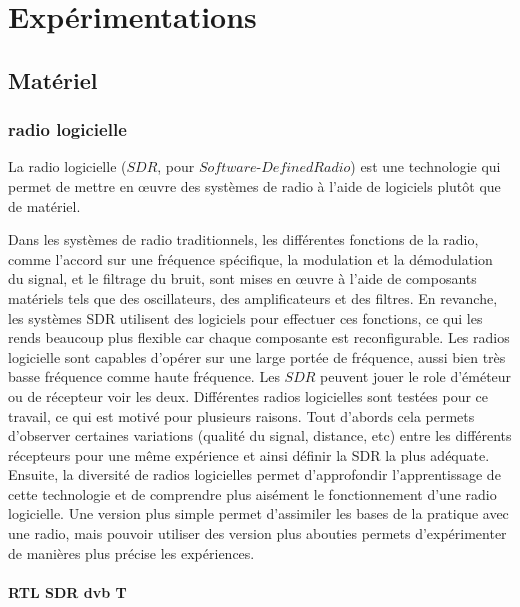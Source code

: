 \chapter{Expérimentations}


\renewcommand{\leftmark}{EXPERIMENTATIONS}

\section{Matériel}

\subsection{radio logicielle}

La radio logicielle ($SDR$, pour $Software$-$Defined Radio$) est une technologie qui permet de mettre en œuvre des systèmes de radio à l'aide de logiciels plutôt que de matériel. 

Dans les systèmes de radio traditionnels, les différentes fonctions de la radio, comme l'accord sur une fréquence spécifique, la modulation et la démodulation du signal, et le filtrage du bruit, sont mises en œuvre à l'aide de composants matériels tels que des oscillateurs, des amplificateurs et des filtres. En revanche, les systèmes SDR utilisent des logiciels pour effectuer ces fonctions, ce qui les rends beaucoup plus flexible car chaque composante est reconfigurable. Les radios logicielle sont capables d'opérer sur une large portée de fréquence, aussi bien très basse fréquence comme haute fréquence.
Les $SDR$ peuvent jouer le role d'éméteur ou de récepteur voir les deux. Différentes radios logicielles sont testées pour ce travail, ce qui est motivé pour plusieurs raisons. Tout d'abords cela permets d'observer certaines variations (qualité du signal, distance, etc) entre les différents récepteurs pour une même expérience et ainsi définir la SDR la plus adéquate. Ensuite, la diversité de radios logicielles permet d'approfondir l'apprentissage de cette technologie et de comprendre plus aisément le fonctionnement d'une radio logicielle. Une version plus simple permet d'assimiler les bases de la pratique avec une radio, mais pouvoir utiliser des version plus abouties permets d'expérimenter de manières plus précise les expériences.

\newpage

\subsubsection{RTL SDR dvb T}

